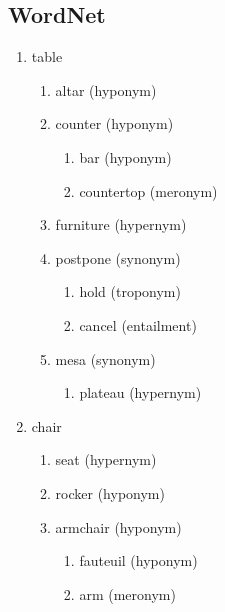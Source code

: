 \documentclass[11pt,a4paper,twocolumn]{article}
\begin{document}
	\subsection{WordNet}
		\begin{enumerate}
			\item table\\
				\begin{enumerate}
					\item altar (hyponym)
					
					\item counter (hyponym)
					
						\begin{enumerate}
							\item bar (hyponym)
							
							\item countertop (meronym)							
						\end{enumerate}
											
					\item furniture (hypernym)
					
					\item postpone (synonym)
						\begin{enumerate}
							\item hold (troponym)
							
							\item cancel (entailment)
						\end{enumerate}
						
					\item mesa (synonym)
						\begin{enumerate}
							\item plateau (hypernym)
						\end{enumerate}											
				\end{enumerate}
				
						
			\item chair
				\begin{enumerate}
					\item seat (hypernym)
					
					\item rocker (hyponym)
					
					\item armchair (hyponym)
						\begin{enumerate}
							\item fauteuil (hyponym)
							
							\item arm (meronym)
							

\end{enumerate}
\end{enumerate}
\end{enumerate}
\end{document}
